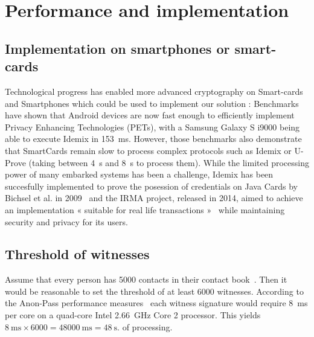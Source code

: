 \section{Performance and implementation}%
\label{PerformanceAnalysis}

\subsection{Implementation on smartphones or smart-cards}
Technological progress has enabled more advanced cryptography on Smart-cards and Smartphones which could be used to implement our solution : Benchmarks~\cite{Benchmarking} have shown that Android devices are now fast enough to efficiently implement Privacy Enhancing Technologies (PETs), with a Samsung Galaxy S i9000 being able to execute Idemix in  \SI{153}{\milli\second}. However, those benchmarks also demonstrate that SmartCards remain slow to process complex protocols such as Idemix or U-Prove (taking between \SI{4}{\second} and \SI{8}{\second} to process them). While the limited processing power of many embarked systems has been a challenge, Idemix has been succesfully implemented to prove the posession of credentials on Java Cards by Bichsel et al. in 2009~\cite{Bichsel} and the IRMA project, released in 2014, aimed to achieve an implementation « suitable for real life transactions »~\cite{IRMA} while maintaining security and privacy for its users. 

\subsection{Threshold of witnesses}

Assume that every person has 5000 contacts in their contact 
book~\cite{DifficultyOfPrivateContactDiscovery}.
Then it would be reasonable to set the threshold of at least 6000 witnesses.
According to the Anon-Pass performance measures~\cite{AnonPass} each witness 
signature would require \SI{8}{\milli\second} per core on a quad-core Intel 
\SI{2.66}{\giga\hertz} Core 2 processor.
This yields \(
  \SI{8}{\milli\second}\times 6000 = \SI{48000}{\milli\second} = 
  \SI{48}{\second}.
\) of processing.
